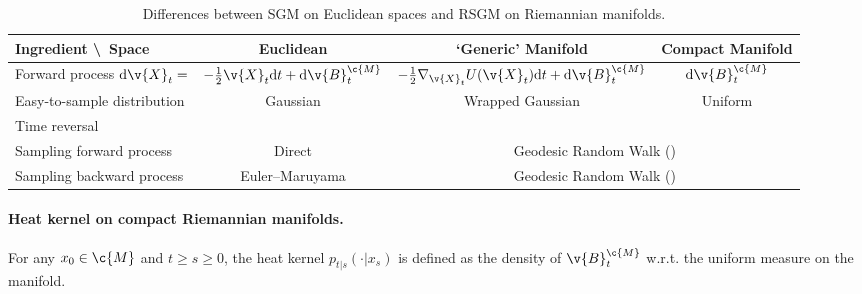 \begin{table}[t]
	\small
	\centering
	\renewcommand*{\arraystretch}{1.2}
	\begin{tabular}{lccc}
		\toprule
		Ingredient \textbackslash ~Space                    & Euclidean                                                        & `Generic' Manifold                & Compact Manifold \\ \hline
		Forward process $\mathrm{d} \v{X}_t=$               & $- \tfrac{1}{2} \v{X}_t \mathrm{d} t + \mathrm{d} \v{B}_t^\c{M}$ & $ - \tfrac{1}{2} \nabla_{\v{X}_t}
		U(\v{X}_t) \mathrm{d} t + \mathrm{d} \v{B}_t^\c{M}$ & $\mathrm{d} \v{B}_t^\c{M}$                                                                                              \\ Easy-to-sample distribution & Gaussian & Wrapped Gaussian & Uniform \\ Time reversal & \textcite{cattiaux2021time} & \multicolumn{2}{c}{\Cref{thm:time_reversal_manifold}} \\ Sampling forward process & Direct & \multicolumn{2}{c}{Geodesic Random Walk (\Cref{alg:grw_rsgm})}\\ Sampling backward process & Euler--Maruyama & \multicolumn{2}{c}{Geodesic Random Walk (\Cref{alg:grw_rsgm})} \\ \bottomrule\end{tabular} \caption{\small Differences between SGM on Euclidean spaces and RSGM on Riemannian manifolds.
	}
	\label{tab:difference}
\end{table}

\paragraph{Heat kernel on compact Riemannian manifolds.}
For any $x_0 \in \c{M}$ and $t \geq s \geq 0$, the heat kernel $p_{t|s}(\cdot|x_s)$ is defined as the density of $\v{B}_t^\c{M}$ w.r.t.
the uniform measure on the manifold.

